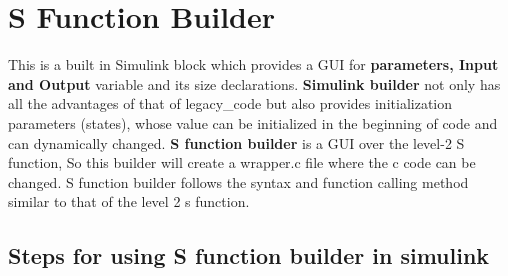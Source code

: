 \documentclass{article}
\begin{document}
\section{S Function Builder}
This is a built in Simulink block which provides a GUI for \textbf{parameters, Input and Output} variable and its size declarations. 
\textbf{Simulink builder} not only has all the advantages of that of legacy\_code but also provides initialization parameters (states), whose value can be initialized in the beginning of code and can dynamically changed. 
\textbf{S function builder} is a GUI over the level-2 S function, So this builder will create a wrapper.c file where the c code can be changed. S function builder follows the syntax and function calling method similar to that of the level 2 s function.
\subsection{Steps for using S function  builder in simulink}
\end{document}
